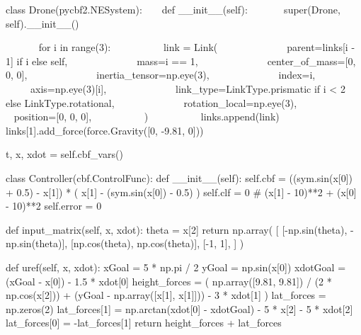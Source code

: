 class Drone(pycbf2.NESystem):
    def __init__(self):
        super(Drone, self).__init__()

        for i in range(3):
            link = Link(
                parent=links[i - 1] if i else self,
                mass=i == 1,
                center_of_mass=[0, 0, 0],
                inertia_tensor=np.eye(3),
                index=i,
                axis=np.eye(3)[i],
                link_type=LinkType.prismatic if i < 2 else LinkType.rotational,
                rotation_local=np.eye(3),
                position=[0, 0, 0],
            )
            links.append(link)
        links[1].add_force(force.Gravity([0, -9.81, 0]))
        
        t, x, xdot = self.cbf_vars()

        class Controller(cbf.ControlFunc):
            def __init__(self):
                self.cbf = ((sym.sin(x[0]) + 0.5) - x[1]) * (
                    x[1] - (sym.sin(x[0]) - 0.5)
                )
                self.clf = 0  # (x[1] - 10)**2 + (x[0] - 10)**2
                self.error = 0

            def input_matrix(self, x, xdot):
                theta = x[2]
                return np.array(
                    [
                        [-np.sin(theta), -np.sin(theta)],
                        [np.cos(theta), np.cos(theta)],
                        [-1, 1],
                    ]
                )

            def uref(self, x, xdot):
                xGoal = 5 * np.pi / 2
                yGoal = np.sin(x[0])
                xdotGoal = (xGoal - x[0]) - 1.5 * xdot[0]
                height_forces = (
                    np.array([9.81, 9.81]) / (2 * np.cos(x[2]))
                    + (yGoal - np.array([x[1], x[1]]))
                    - 3 * xdot[1]
                )
                lat_forces = np.zeros(2)
                lat_forces[1] = np.arctan(xdot[0] - xdotGoal) - 5 * x[2] - 5 * xdot[2]
                lat_forces[0] = -lat_forces[1]
                return height_forces + lat_forces

